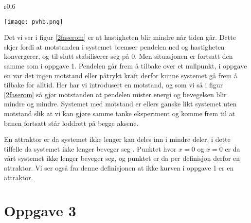 \documentclass[norsk,a4paper,12pt]{article}
\begin{document}
\begin{wrapfigure}{r}{0.6\textwidth}
	\begin{center}
	\texttt{[image: pvhb.png]}
	\end{center}
	\caption[Faserommet til systemet uten påtrykt kraft, med en motstand]{Plott som beskriver faserommet til systemet med en motstand}
	\label{2faserom}
\end{wrapfigure}


Det vi ser i figur \vref{2faserom} er at hastigheten blir mindre når tiden går. Dette skjer fordi at motstanden i systemet bremser pendelen ned og hastigheten konvergerer, og til slutt stabiliserer seg på 0. Men situasjonen er fortsatt den samme som i oppgave 1. Pendelen går frem å tilbake over et nullpunkt, i oppgave en var det ingen motstand eller påtrykt kraft derfor kunne systemet gå frem å tilbake for alltid. Her har vi introdusert en motstand, og som vi så i figur \ref{2faserom} så gjør motstanden at pendelen mister energi og bevegelsen blir mindre og mindre. Systemet med motstand er ellers ganske likt systemet uten motstand slik at vi kan gjøre samme tanke eksperiment og komme frem til at banen fortsatt står loddrett på begge aksene. 

En attraktor er da systemet ikke lenger kan deles inn i mindre deler, i dette tilfelle da systemet ikke lenger beveger seg \cite{Milnor:2006}. Punktet hvor $x=0$ og $\dot{x}=0$ er da vårt systemet ikke lenger beveger seg, og punktet er da per definisjon derfor en attraktor. Vi ser også fra denne definisjonen at ikke kurven i oppgave 1 er en attraktor. 

\section{Oppgave 3}
\end{document}
